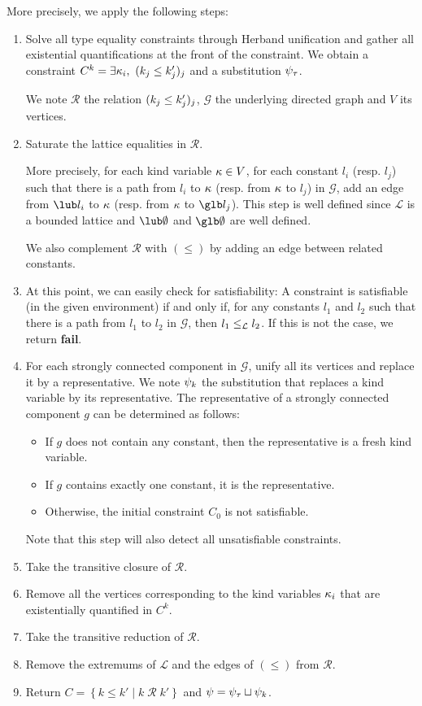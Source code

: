 More precisely, we apply the following steps:
\begin{enumerate}
\item Solve all type equality constraints through Herband unification and
  gather all existential quantifications at the front of the constraint.
  We obtain a constraint $C^k = \exists \kappa_i,\ (k_j \leq k'_j)_j$ and
  a substitution $\mathrm{\psi}_\tau$.
  
  We note $\mathcal R$ the relation $(k_j \leq k'_j)_j$,
  $\mathcal G$ the underlying directed graph and $V$ its vertices.

\item Saturate the lattice equalities in $\mathcal R$.
  
  More precisely, for each kind variable $\kappa \in V$,
  for each constant $l_i$ (resp. $l_j$) such that
  there is a path from $l_i$ to $\kappa$ (resp. from $\kappa$ to $l_j$) in $\mathcal G$,
  add an edge from $\lub l_i$ to $\kappa$
  (resp. from $\kappa$ to $\glb l_j$).
  This step is well defined since $\mathcal L$ is a bounded lattice
  and $\lub\emptyset$ and $\glb\emptyset$ are well defined.

  We also complement $\mathcal R$ with $(\leq)$ by adding an edge
  between related constants.
\item
  At this point, we can easily check for satisfiability: A constraint
  is satisfiable (in the given environment) if and only if,
  for any constants $l_1$ and $l_2$ such that
  there is a path from $l_1$ to $l_2$ in $\mathcal G$, then $l_1\leq_\mathcal L l_2$.
  If this is not the case, we return \textbf{fail}.
  
\item For each strongly connected component in $\mathcal G$, unify all its vertices and replace it by a representative.
  We note $\mathrm{\psi}_k$ the substitution that replaces a kind variable by
  its representative.
  The representative of a strongly connected component $g$ can be determined as follows:
  \begin{itemize}
  \item If $g$ does not contain any constant, then the representative
    is a fresh kind variable.
  \item If $g$ contains exactly one constant, it is the representative.
  \item Otherwise, the initial constraint $C_0$ is not satisfiable.
  \end{itemize}
  Note that this step will also detect all unsatisfiable constraints.
\item Take the transitive closure of $\mathcal R$.
\item Remove all the vertices corresponding to the kind variables $\kappa_i$
  that are existentially quantified in $C^k$.
\item Take the transitive reduction of $\mathcal R$.
\item Remove the extremums of $\mathcal L$ and the edges of $(\leq)$
  from $\mathcal R$.
\item Return $C = \left\{ k \leq k' \mid k \operatorname{\mathcal R}k' \right\}$
  and $\mathrm{\psi} =  \mathrm{\psi}_\tau \sqcup \mathrm{\psi}_k$.
\end{enumerate}

